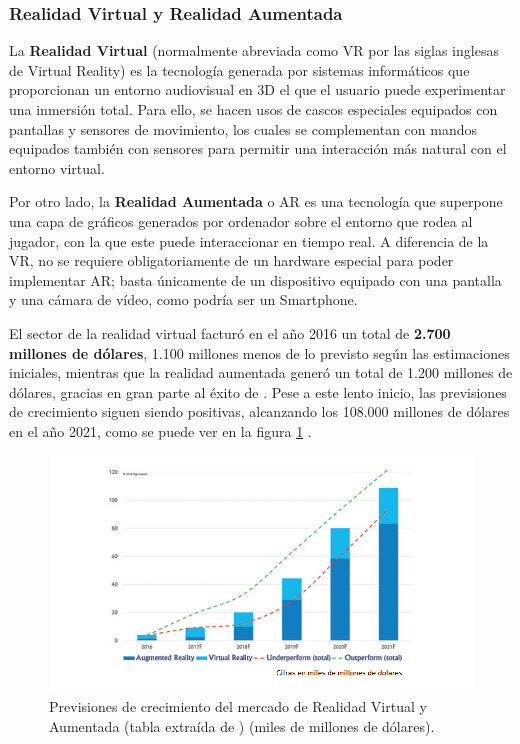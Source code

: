 \subsubsection{Realidad Virtual y Realidad Aumentada}
La \textbf{Realidad Virtual} (normalmente abreviada como VR por las siglas inglesas de Virtual Reality) es la tecnología generada por sistemas informáticos que proporcionan un entorno audiovisual en 3D el que el usuario puede experimentar una inmersión total. Para ello, se hacen usos de cascos especiales equipados con pantallas y sensores de movimiento, los cuales se complementan con mandos equipados también con sensores para permitir una interacción más natural con el entorno virtual.

Por otro lado, la \textbf{Realidad Aumentada} o AR es una tecnología que superpone una capa de gráficos generados por ordenador sobre el entorno que rodea al jugador, con la que este puede interaccionar en tiempo real. A diferencia de la VR, no se requiere obligatoriamente de un hardware especial para poder implementar AR; basta únicamente de un dispositivo equipado con una pantalla y una cámara de vídeo, como podría ser un Smartphone.

El sector de la realidad virtual facturó en el año 2016 un total de \textbf{2.700 millones de dólares}, 1.100 millones menos de lo previsto según las estimaciones iniciales, mientras que la realidad aumentada generó un total de 1.200 millones de dólares, gracias en gran parte al éxito de . Pese a este lento inicio, las previsiones de crecimiento siguen siendo positivas, alcanzando los 108.000 millones de dólares en el año 2021, como se puede ver en la figura \ref{crecimiento-vr} \cite{libro_blanco}.
\begin{figure}[!t]
    \centering
    \includegraphics[width=1\textwidth]{images/estadodelarte/mercado/crecimiento-vr}
    \caption{Previsiones de crecimiento del mercado de Realidad Virtual y Aumentada (tabla extraída de \cite{libro_blanco}) (miles de millones de dólares).}
    \label{crecimiento-vr}
\end{figure}

